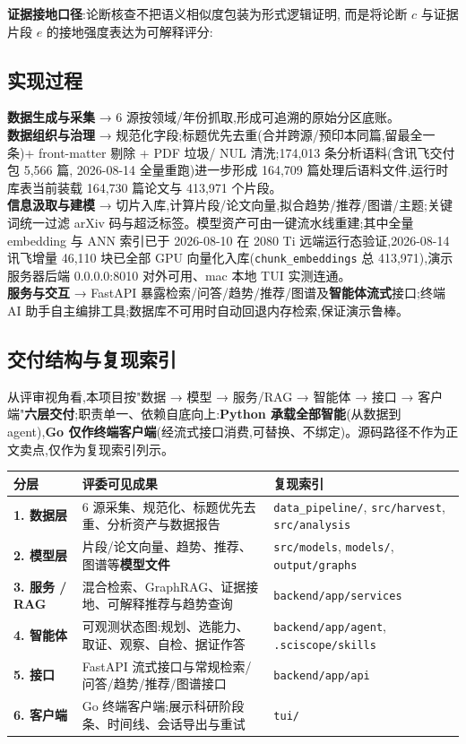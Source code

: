 \textbf{证据接地口径}:论断核查不把语义相似度包装为形式逻辑证明, 而是将论断 $c$ 与证据片段 $e$ 的接地强度表达为可解释评分:

\subsection{实现过程}
\textbf{数据生成与采集} → 6 源按领域/年份抓取,形成可追溯的原始分区底账。\\
\textbf{数据组织与治理} → 规范化字段;标题优先去重(合并跨源/预印本同篇,留最全一条)+ front-matter 剔除 + PDF 垃圾/ NUL 清洗;174{,}013 条分析语料(含讯飞交付包 5{,}566 篇, 2026-08-14 全量重跑)进一步形成 164{,}709 篇处理后语料文件,运行时库表当前装载 164{,}730 篇论文与 413{,}971 个片段。\\
\textbf{信息汲取与建模} → 切片入库,计算片段/论文向量,拟合趋势/推荐/图谱/主题;关键词统一过滤 arXiv 码与超泛标签。模型资产可由一键流水线重建;其中全量 embedding 与 ANN 索引已于 2026-08-10 在 2080 Ti 远端运行态验证,2026-08-14 讯飞增量 46{,}110 块已全部 GPU 向量化入库(\texttt{chunk\_embeddings} 总 413{,}971),演示服务器后端 0.0.0.0:8010 对外可用、mac 本地 TUI 实测连通。\\
\textbf{服务与交互} → FastAPI 暴露检索/问答/趋势/推荐/图谱及\textbf{智能体流式}接口;终端 AI 助手自主编排工具;数据库不可用时自动回退内存检索,保证演示鲁棒。

\subsection{交付结构与复现索引}
从评审视角看,本项目按"数据 → 模型 → 服务/RAG → 智能体 → 接口 → 客户端"\textbf{六层交付};职责单一、依赖自底向上:\textbf{Python 承载全部智能}(从数据到 agent),\textbf{Go 仅作终端客户端}(经流式接口消费,可替换、不绑定)。源码路径不作为正文卖点,仅作为复现索引列示。

\begin{tableblock}
\begin{tabularx}{0.96\textwidth}{>{\bfseries}p{22mm}XX}
\toprule
分层 & 评委可见成果 & 复现索引 \\
\midrule
1. 数据层 & 6 源采集、规范化、标题优先去重、分析资产与数据报告 & \texttt{data\_pipeline/}, \texttt{src/harvest}, \texttt{src/analysis} \\
2. 模型层 & 片段/论文向量、趋势、推荐、图谱等\textbf{模型文件} & \texttt{src/models}, \texttt{models/}, \texttt{output/graphs} \\
3. 服务 / RAG & 混合检索、GraphRAG、证据接地、可解释推荐与趋势查询 & \texttt{backend/app/services} \\
4. 智能体 & 可观测状态图:规划、选能力、取证、观察、自检、据证作答 & \texttt{backend/app/agent}, \texttt{.sciscope/skills} \\
5. 接口 & FastAPI 流式接口与常规检索/问答/趋势/推荐/图谱接口 & \texttt{backend/app/api} \\
6. 客户端 & Go 终端客户端;展示科研阶段条、时间线、会话导出与重试 & \texttt{tui/} \\
\bottomrule
\end{tabularx}
\end{tableblock}
